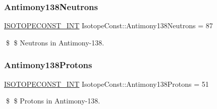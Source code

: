 \subsubsection{\texorpdfstring{Antimony138\+Neutrons}{Antimony138Neutrons}}
{\footnotesize\ttfamily \mbox{\hyperlink{group___isotope_const-_macros_ga5f18360b3e99483a35c32d789e62621c}{I\+S\+O\+T\+O\+P\+E\+C\+O\+N\+S\+T\+\_\+\+I\+NT}} Isotope\+Const\+::\+Antimony138\+Neutrons = 87}

\$ \$ Neutrons in Antimony-\/138. \mbox{\label{group___isotope_const-_antimony-_sb138_ga59adcb820c5d4ec0b91f133fe1942b33}} 
\subsubsection{\texorpdfstring{Antimony138\+Protons}{Antimony138Protons}}
{\footnotesize\ttfamily \mbox{\hyperlink{group___isotope_const-_macros_ga5f18360b3e99483a35c32d789e62621c}{I\+S\+O\+T\+O\+P\+E\+C\+O\+N\+S\+T\+\_\+\+I\+NT}} Isotope\+Const\+::\+Antimony138\+Protons = 51}

\$ \$ Protons in Antimony-\/138. 